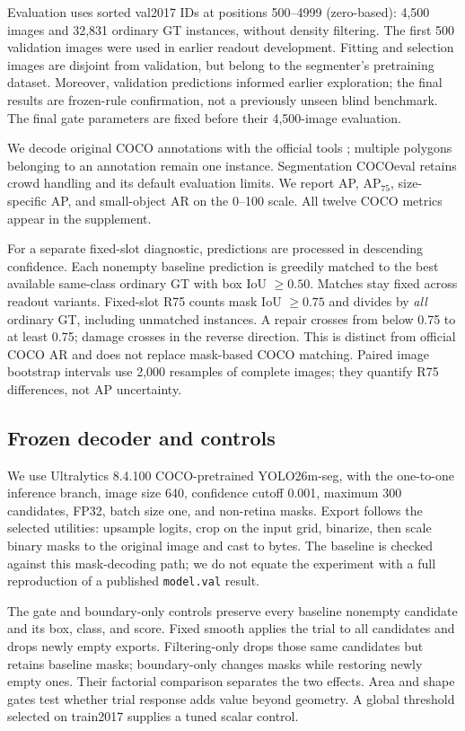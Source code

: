 \documentclass[times,twocolumn,final,authoryear]{elsarticle}
\begin{document}
Evaluation uses sorted val2017 IDs at positions 500--4999 (zero-based): 4,500 images and 32,831 ordinary GT instances, without density filtering. The first 500 validation images were used in earlier readout development. Fitting and selection images are disjoint from validation, but belong to the segmenter's pretraining dataset. Moreover, validation predictions informed earlier exploration; the final results are frozen-rule confirmation, not a previously unseen blind benchmark. The final gate parameters are fixed before their 4,500-image evaluation.

We decode original COCO annotations with the official tools \citep{cocoeval}; multiple polygons belonging to an annotation remain one instance. Segmentation COCOeval retains crowd handling and its default evaluation limits. We report AP, AP$_{75}$, size-specific AP, and small-object AR on the 0--100 scale. All twelve COCO metrics appear in the supplement.

For a separate fixed-slot diagnostic, predictions are processed in descending confidence. Each nonempty baseline prediction is greedily matched to the best available same-class ordinary GT with box IoU $\geq0.50$. Matches stay fixed across readout variants. Fixed-slot R75 counts mask IoU $\geq0.75$ and divides by \emph{all} ordinary GT, including unmatched instances. A repair crosses from below 0.75 to at least 0.75; damage crosses in the reverse direction. This is distinct from official COCO AR and does not replace mask-based COCO matching. Paired image bootstrap intervals use 2,000 resamples of complete images; they quantify R75 differences, not AP uncertainty.

\subsection{Frozen decoder and controls}
We use Ultralytics 8.4.100 COCO-pretrained YOLO26m-seg, with the one-to-one inference branch, image size 640, confidence cutoff 0.001, maximum 300 candidates, FP32, batch size one, and non-retina masks. Export follows the selected utilities: upsample logits, crop on the input grid, binarize, then scale binary masks to the original image and cast to bytes. The baseline is checked against this mask-decoding path; we do not equate the experiment with a full reproduction of a published \texttt{model.val} result.

The gate and boundary-only controls preserve every baseline nonempty candidate and its box, class, and score. Fixed smooth applies the trial to all candidates and drops newly empty exports. Filtering-only drops those same candidates but retains baseline masks; boundary-only changes masks while restoring newly empty ones. Their factorial comparison separates the two effects. Area and shape gates test whether trial response adds value beyond geometry. A global threshold selected on train2017 supplies a tuned scalar control.
\end{document}
